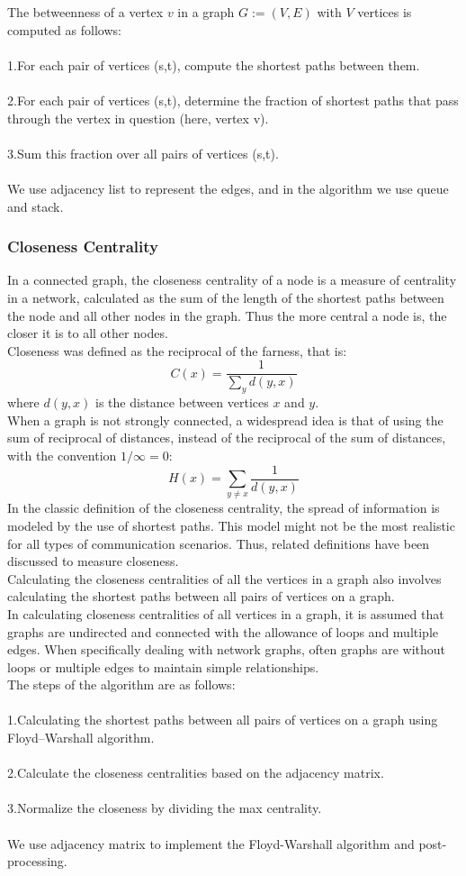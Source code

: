 \documentclass{article}
\begin{document}
The betweenness of a vertex ${\displaystyle v}$ in a graph ${\displaystyle G:=(V,E)} $ with ${\displaystyle V}$ vertices is computed as follows:\\\\
1.For each pair of vertices (s,t), compute the shortest paths between them.\\\\
2.For each pair of vertices (s,t), determine the fraction of shortest paths that pass through the vertex in question (here, vertex v).\\\\
3.Sum this fraction over all pairs of vertices (s,t).\\\\
We use adjacency list to represent the edges, and in the algorithm we use queue and stack.
\subsubsection{Closeness Centrality}
In a connected graph, the closeness centrality of a node is a measure of centrality in a network, calculated as the sum of the length of the shortest paths between the node and all other nodes in the graph. Thus the more central a node is, the closer it is to all other nodes.\\
Closeness was defined as the reciprocal of the farness, that is:
\[C(x) = \frac{1}{\sum_{y}d(y, x)}\]
where $d(y, x)$ is the distance between vertices $x$ and $y$.\\
When a graph is not strongly connected, a widespread idea is that of using the sum of reciprocal of distances, instead of the reciprocal of the sum of distances, with the convention $1/\infty = 0$:
\[H(x) = \sum_{y\neq x}\frac{1}{d(y, x)}\]
In the classic definition of the closeness centrality, the spread of information is modeled by the use of shortest paths. This model might not be the most realistic for all types of communication scenarios. Thus, related definitions have been discussed to measure closeness.\\
Calculating the closeness centralities of all the vertices in a graph also involves calculating the shortest paths between all pairs of vertices on a graph.\\
In calculating closeness centralities of all vertices in a graph, it is assumed that graphs are undirected and connected with the allowance of loops and multiple edges. When specifically dealing with network graphs, often graphs are without loops or multiple edges to maintain simple relationships.\\
The steps of the algorithm are as follows:\\\\
1.Calculating the shortest paths between all pairs of vertices on a graph using Floyd–Warshall algorithm.\\\\
2.Calculate the closeness centralities based on the adjacency matrix.\\\\
3.Normalize the closeness by dividing the max centrality.\\\\
We use adjacency matrix to implement the Floyd-Warshall algorithm and post-processing.
\end{document}
